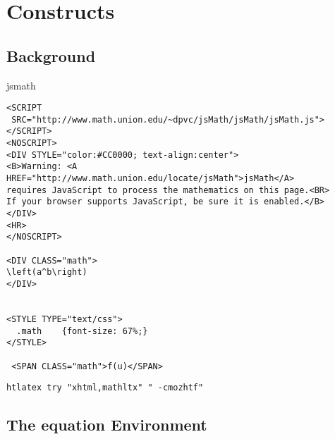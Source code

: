 %

\ifx \HTML\UnDef
   \def\HTML{mathltx,html-mltx} 
   \def\CONFIG{\jobname}
   \def\MAKETITLE{\author{Eitan M. Gurari}}
   \def\next{  \endinput}
   \expandafter\next
\fi





\chapter{Constructs}


\section{Background}

jsmath\EndLink


\begin{verbatim}
<SCRIPT
 SRC="http://www.math.union.edu/~dpvc/jsMath/jsMath/jsMath.js"></SCRIPT> 
<NOSCRIPT> 
<DIV STYLE="color:#CC0000; text-align:center"> 
<B>Warning: <A HREF="http://www.math.union.edu/locate/jsMath">jsMath</A> 
requires JavaScript to process the mathematics on this page.<BR> 
If your browser supports JavaScript, be sure it is enabled.</B> 
</DIV> 
<HR> 
</NOSCRIPT>
 
<DIV CLASS="math"> 
\left(a^b\right)
</DIV> 


<STYLE TYPE="text/css">
  .math    {font-size: 67%;}
</STYLE>

 <SPAN CLASS="math">f(u)</SPAN> 

\end{verbatim}

\begin{verbatim}
htlatex try "xhtml,mathltx" " -cmozhtf" 
\end{verbatim}

\section{The equation Environment}



